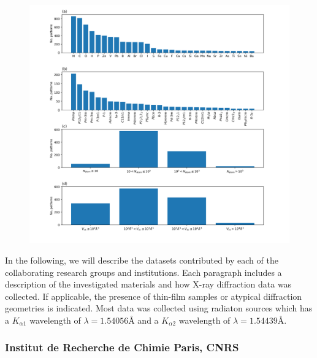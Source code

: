 \begin{figure}[!htb]
    \centering
    \includegraphics[width=\linewidth]{figures/hist_CRYSTAL.png}
    \caption{}
    \label{fig:hist_CRYSTAL}
\end{figure}

\pagebreak

In the following, we will describe the datasets contributed by each of the collaborating research groups and institutions. Each paragraph includes a description of the investigated materials and how X-ray diffraction data was collected. If applicable, the presence of thin-film samples or atypical diffraction geometries is indicated. Most data was collected using  radiaton sources which has a $K_{\alpha1}$ wavelength of $\lambda=1.54056\text{\AA}$ and a $K_{\alpha2}$ wavelength of $\lambda=1.54439\text{\AA}$.

\subsubsection*{Institut de Recherche de Chimie Paris, CNRS}

